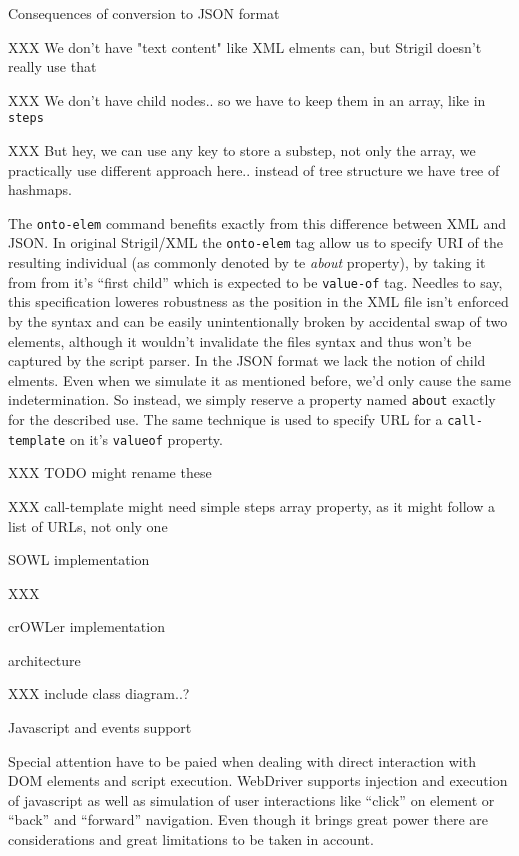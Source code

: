 \secc Consequences of conversion to JSON format

XXX We don't have "text content" like XML elments can, but Strigil doesn't really use that

XXX We don't have child nodes.. so we have to keep them in an array, like in {\tt steps} 

XXX But hey, we can use any key to store a substep, not only the array, we
practically use different approach here.. instead of tree structure we have
tree of hashmaps. 

The {\tt onto-elem} command benefits exactly from this difference between
XML and JSON.  In original Strigil/XML the {\tt onto-elem} tag allow us to
specify URI of the resulting individual (as commonly denoted by te {\em about}
property), by taking it from from it's ``first child'' which is expected to
be {\tt value-of} tag. Needles to say, this specification loweres robustness as
the position in the XML file isn't enforced by the syntax and can be easily
unintentionally broken by accidental swap of two elements, although it wouldn't
invalidate the files syntax and thus won't be captured by the script parser. In
the JSON format we lack the notion of child elments. Even when we simulate it
as mentioned before, we'd only cause the same indetermination. So instead, we
simply reserve a property named {\tt about} exactly for the described use. 
The same technique is used to specify URL for a {\tt call-template} on it's
{\tt valueof} property. 

XXX TODO might rename these

XXX call-template might need simple steps array property, as it might follow a
list of URLs, not only one

\sec SOWL implementation

XXX 

\sec crOWLer implementation

\secc architecture

XXX include class diagram..?


\secc Javascript and events support

Special attention have to be paied when dealing with direct interaction with
DOM elements and script execution. WebDriver supports injection and execution
of javascript as well as simulation of user interactions like ``click'' on
element or ``back'' and ``forward'' navigation. Even though it brings great
power there are considerations and great limitations to be taken in account. 

